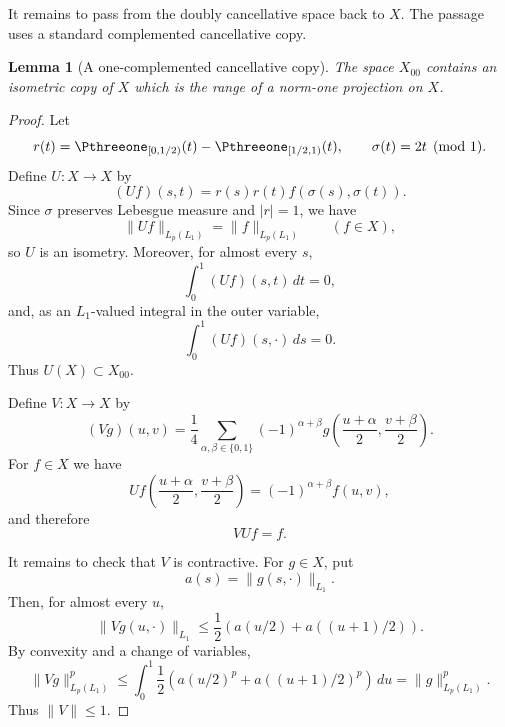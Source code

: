 \documentclass[11pt,reqno]{amsart}
\makeatletter
\theoremstyle{plain}
\newtheorem{lemma}[lemma]{Lemma}
\theoremstyle{definition}
\newcounter{problempaper}
\newenvironment{problempaperbody}{%
  \setcounter{subsection}{0}%
  \setcounter{subsubsection}{0}%
  \setcounter{paragraph}{0}%
  \renewcommand{\thesubsection}{\arabic{subsection}}%
  \renewcommand{\thesubsubsection}{\thesubsection.\arabic{subsubsection}}%
  \renewcommand{\theparagraph}{\thesubsubsection.\arabic{paragraph}}%
  \let\problem@outersection\section
  \let\problem@outersubsection\subsection
  \let\problem@outersubsubsection\subsubsection
  \let\problem@outerparagraph\paragraph
  \let\section\problem@papersection
  \let\subsection\problem@papersubsection
  \let\subsubsection\problem@papersubsubsection
}{%
  \let\section\problem@outersection
  \let\subsection\problem@outersubsection
  \let\subsubsection\problem@outersubsubsection
  \let\paragraph\problem@outerparagraph
}
\newcommand{\problem@target}[2]{%
  \hypertarget{problem-\theproblempaper-#1-#2}{}%
}
\newcommand{\problem@paperheading}[3]{%
  \par\bigskip
  \problem@target{#1}{#2}%
  \noindent{\large\bfseries #2.\quad #3\par}%
  \nobreak\smallskip
}
\newcommand{\problem@papersubheading}[3]{%
  \par\medskip
  \problem@target{#1}{#2}%
  \noindent{\normalsize\bfseries #2.\quad #3\par}%
  \nobreak\smallskip
}
\newcommand{\problem@papersubsubheading}[3]{%
  \par\smallskip
  \problem@target{#1}{#2}%
  \noindent{\normalsize\itshape #2.\quad #3.\ }%
}
\def\problem@papersection{%
  \@ifstar{\problem@papersectionstar}{\problem@papersectionnostar}%
}
\def\problem@papersectionstar#1{%
  \par\bigskip\noindent{\large\bfseries #1\par}\nobreak\smallskip
}
\def\problem@papersectionnostar#1{%
  \refstepcounter{subsection}%
  \setcounter{subsubsection}{0}%
  \setcounter{paragraph}{0}%
  \problem@paperheading{section}{\thesubsection}{#1}%
  \problem@writecontentsline{section}{\thesubsection}{#1}%
}
\def\problem@papersubsection{%
  \@ifstar{\problem@papersubsectionstar}{\problem@papersubsectionnostar}%
}
\def\problem@papersubsectionstar#1{%
  \par\medskip\noindent{\normalsize\bfseries #1\par}\nobreak\smallskip
}
\def\problem@papersubsectionnostar#1{%
  \refstepcounter{subsubsection}%
  \setcounter{paragraph}{0}%
  \problem@papersubheading{subsection}{\thesubsubsection}{#1}%
  \problem@writecontentsline{subsection}{\thesubsubsection}{#1}%
}
\def\problem@papersubsubsection{%
  \@ifstar{\problem@papersubsubsectionstar}{\problem@papersubsubsectionnostar}%
}
\def\problem@papersubsubsectionstar#1{%
  \par\smallskip\noindent{\normalsize\itshape #1.\ }%
}
\def\problem@papersubsubsectionnostar#1{%
  \refstepcounter{paragraph}%
  \problem@papersubsubheading{subsubsection}{\theparagraph}{#1}%
  \problem@writecontentsline{subsubsection}{\theparagraph}{#1}%
}
\newcommand{\problem@writecontentsline}[3]{%
  \begingroup
  \protected@write\@auxout{}{%
    \string\problemcontentsentry{\theproblempaper}{#1}{#2}{#3}{\thepage}%
  }%
  \endgroup
}
\newcommand{\problemcontentsentry}[5]{%
  \@ifundefined{problemcontents@#1}{%
    \expandafter\gdef\csname problemcontents@#1\endcsname{}%
  }{}%
  \expandafter\g@addto@macro\csname problemcontents@#1\endcsname{%
    \problemcontentsline{#1}{#2}{#3}{#4}{#5}%
  }%
}
\newcommand{\problemcontentslink}[4]{%
  \hyperlink{problem-#1-#2-#3}{#4}%
}
\newcommand{\problemcontentsline}[5]{%
  \ifstrequal{#2}{section}{%
    \par\noindent
    \problemcontentslink{#1}{#2}{#3}{\makebox[2.5em][l]{#3}#4}%
    \nobreak\dotfill
    \problemcontentslink{#1}{#2}{#3}{#5}\par
  }{%
    \ifstrequal{#2}{subsection}{%
      \par\noindent\hspace*{1.5em}%
      \problemcontentslink{#1}{#2}{#3}{\makebox[3.5em][l]{#3}#4}%
      \nobreak\dotfill
      \problemcontentslink{#1}{#2}{#3}{#5}\par
    }{%
      \par\noindent\hspace*{3em}%
      \problemcontentslink{#1}{#2}{#3}{\makebox[4.5em][l]{#3}#4}%
      \nobreak\dotfill
      \problemcontentslink{#1}{#2}{#3}{#5}\par
    }%
  }%
}
\makeatother
\begin{document}
\begin{problempaperbody}
It remains to pass from the doubly cancellative space back to $X$. The passage uses a standard complemented cancellative copy.

\begin{lemma}[A one-complemented cancellative copy]
\label{p3:lem:cancellative-copy}
The space $X_{00}$ contains an isometric copy of $X$ which is the range of a norm-one projection on $X$.
\end{lemma}

\begin{proof}
Let
\begin{equation*}
        r(t)=\Pthreeone_{[0,1/2)}(t)-\Pthreeone_{[1/2,1)}(t),\qquad \sigma(t)=2t\pmod 1 .
\end{equation*}
Define $U\colon X\to X$ by
\begin{equation*}
        (Uf)(s,t)=r(s)r(t)f(\sigma(s),\sigma(t)).
\end{equation*}
Since $\sigma$ preserves Lebesgue measure and $|r|=1$, we have
\begin{equation*}
        \|Uf\|_{L_p(L_1)}=\|f\|_{L_p(L_1)}\qquad(f\in X),
\end{equation*}
so $U$ is an isometry. Moreover, for almost every $s$,
\begin{equation*}
        \int_0^1 (Uf)(s,t)\,dt=0,
\end{equation*}
and, as an $L_1$-valued integral in the outer variable,
\begin{equation*}
        \int_0^1 (Uf)(s,\cdot)\,ds=0.
\end{equation*}
Thus $U(X)\subset X_{00}$.

Define $V\colon X\to X$ by
\begin{equation*}
        (Vg)(u,v)=\frac14\sum_{\alpha,\beta\in\{0,1\}}(-1)^{\alpha+\beta}g\left(\frac{u+\alpha}{2},\frac{v+\beta}{2}\right).
\end{equation*}
For $f\in X$ we have
\begin{equation*}
        U f\left(\frac{u+\alpha}{2},\frac{v+\beta}{2}\right)=(-1)^{\alpha+\beta}f(u,v),
\end{equation*}
and therefore
\begin{equation*}
        VUf=f.
\end{equation*}

It remains to check that $V$ is contractive. For $g\in X$, put
\begin{equation*}
        a(s)=\|g(s,\cdot)\|_{L_1}.
\end{equation*}
Then, for almost every $u$,
\begin{equation*}
        \|Vg(u,\cdot)\|_{L_1}\leq \frac12\left(a(u/2)+a((u+1)/2)\right).
\end{equation*}
By convexity and a change of variables,
\begin{equation*}
        \|Vg\|_{L_p(L_1)}^p\leq \int_0^1\frac12\left(a(u/2)^p+a((u+1)/2)^p\right)\,du=\|g\|_{L_p(L_1)}^p.
\end{equation*}
Thus $\|V\|\leq1$.


\end{proof}
\end{problempaperbody}
\end{document}
